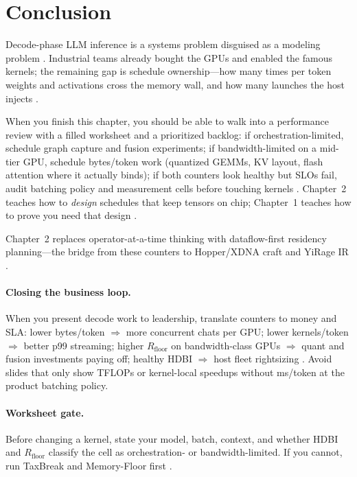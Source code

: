 \section{Conclusion}
\label{sec:ch01_conclusion}

Decode-phase LLM inference is a systems problem disguised as a modeling problem \citep{nakai2025efficientbatchproc}.
Industrial teams already bought the GPUs and enabled the famous kernels; the remaining gap is schedule ownership---how many times per token weights and activations cross the memory wall, and how many launches the host injects \citep{taxbreak2026,memoryfloor2026}.


When you finish this chapter, you should be able to walk into a performance review with a filled worksheet and a prioritized backlog:
if orchestration-limited, schedule graph capture and fusion experiments;
if bandwidth-limited on a mid-tier GPU, schedule bytes/token work (quantized GEMMs, KV layout, flash attention where it actually binds);
if both counters look healthy but SLOs fail, audit batching policy and measurement cells before touching kernels \citep{taxbreak2026,memoryfloor2026,kwon2023vllm}.
Chapter~2 teaches how to \emph{design} schedules that keep tensors on chip; Chapter~1 teaches how to prove you need that design \citep{chen2020compilerbasedhardw,dlbook}.

Chapter~2 replaces operator-at-a-time thinking with dataflow-first residency planning---the bridge from these counters to Hopper/XDNA craft and YiRage IR \citep{chen2020compilerbasedhardw,dlbook}.


\paragraph{Closing the business loop.}
When you present decode work to leadership, translate counters to money and SLA:
lower bytes/token $\Rightarrow$ more concurrent chats per GPU;
lower kernels/token $\Rightarrow$ better p99 streaming;
higher $R_{\mathrm{floor}}$ on bandwidth-class GPUs $\Rightarrow$ quant and fusion investments paying off;
healthy HDBI $\Rightarrow$ host fleet rightsizing \citep{taxbreak2026,memoryfloor2026,fan2025ellieenergyefficie}.
Avoid slides that only show TFLOPs or kernel-local speedups without ms/token at the product batching policy.

\paragraph{Worksheet gate.}
Before changing a kernel, state your model, batch, context, and whether HDBI and $R_{\mathrm{floor}}$ classify the cell as orchestration- or bandwidth-limited.
If you cannot, run TaxBreak and Memory-Floor first \citep{taxbreak2026,memoryfloor2026}.


